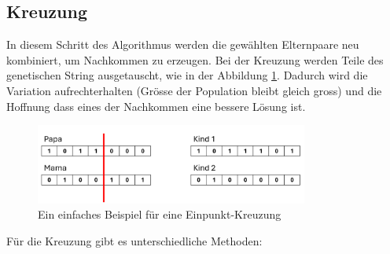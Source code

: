 %
%
%
%
\subsection{Kreuzung
\label{buch:paper:varalg:subsection:crossover}}
In diesem Schritt des Algorithmus werden die gewählten Elternpaare 
neu kombiniert, um Nachkommen zu erzeugen. Bei der Kreuzung werden 
Teile des genetischen String ausgetauscht, wie in der Abbildung
\ref{fig:one_point_crossover}. Dadurch wird die Variation 
aufrechterhalten (Grösse der Population bleibt gleich gross) und
die Hoffnung dass eines der Nachkommen eine bessere Lösung ist.
\begin{figure}
	\centering
	\includegraphics[width=0.8\textwidth]{
		papers/varalg/images/teil3/05GeneticStringCross.png
	}
	\caption{Ein einfaches Beispiel für eine Einpunkt-Kreuzung}
	\label{fig:one_point_crossover}
\end{figure}
Für die Kreuzung gibt es unterschiedliche Methoden:
